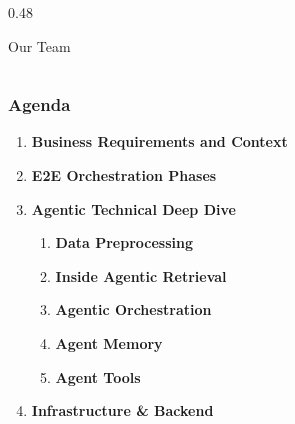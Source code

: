 \documentclass{beamer}
\begin{document}
\begin{frame}
\begin{columns}[T]
\begin{column}{0.48\textwidth}
\vspace{0.25cm}
\begin{block}{\footnotesize Our Team}
\centering
{}
\end{block}
\end{column}
\end{columns}
\end{frame}

\begin{frame}
\frametitle{Agenda}
\begin{enumerate}
  \item \textbf{Business Requirements and Context}
  \item \textbf{E2E Orchestration Phases}
  \item \textbf{Agentic Technical Deep Dive}
  \begin{enumerate}
    \item \textbf{Data Preprocessing}
    \item \textbf{Inside Agentic Retrieval}
    \item \textbf{Agentic Orchestration}
    \item \textbf{Agent Memory}
    \item \textbf{Agent Tools}
  \end{enumerate}
  \item \textbf{Infrastructure \& Backend}
\end{enumerate}
\end{frame}


\end{document}
